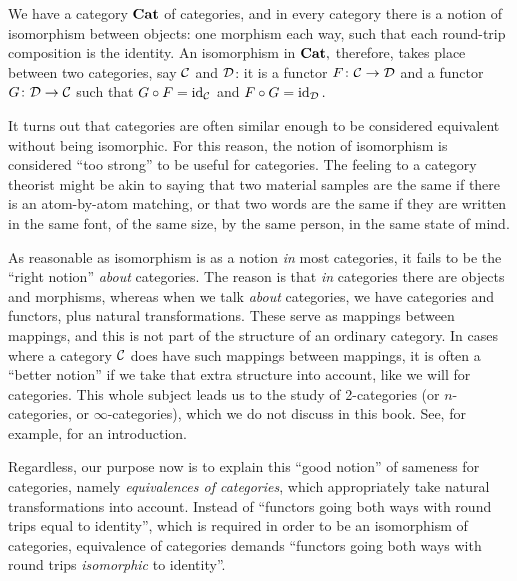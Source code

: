 \documentclass[../main/CT4S-EN-RU]{subfiles}
\begin{document}
\begin{blockENG}
We have a category ${\mathbf{Cat}}$ of categories, and in every category there is a notion of isomorphism between objects: one morphism each way, such that each round-trip composition is the identity. An isomorphism in ${\mathbf{Cat}},$ therefore, takes place between two categories, say $\mathcal{C}$ and $\mathcal{D}$: it is a functor $F\colon\mathcal{C}\rightarrow\mathcal{D}$ and a functor $G\colon\mathcal{D}\rightarrow\mathcal{C}$ such that $G\circ F=\operatorname{id}_\mathcal{C}$ and $F\circ G=\operatorname{id}_\mathcal{D}.$ 
\end{blockENG}

\begin{blockRUS}
\end{blockRUS}

\begin{blockENG}
It turns out that categories are often similar enough to be considered equivalent without being isomorphic. For this reason, the notion of isomorphism is considered “too strong” to be useful for categories. The feeling to a category theorist might be akin to saying that two material samples are the same if there is an atom-by-atom matching, or that two words are the same if they are written in the same font, of the same size, by the same person, in the same state of mind. 
\end{blockENG}

\begin{blockRUS}
\end{blockRUS}

\begin{blockENG}
As reasonable as isomorphism is as a notion {\em in} most categories, it fails to be the “right notion” {\em about} categories. The reason is that {\em in} categories there are objects and morphisms, whereas when we talk {\em about} categories, we have categories and functors, plus natural transformations. These serve as mappings between mappings, and this is not part of the structure of an ordinary category. In cases where a category $\mathcal{C}$ does have such mappings between mappings, it is often a “better notion” if we take that extra structure into account, like we will for categories. This whole subject leads us to the study of 2-categories (or $n$-categories, or $\infty$-categories), which we do not discuss in this book. See, for example, \cite{Le1} for an introduction.
\end{blockENG}

\begin{blockRUS}
\end{blockRUS}

\begin{blockENG}
Regardless, our purpose now is to explain this “good notion” of sameness for categories, namely {\em equivalences of categories}, which appropriately take natural transformations into account. Instead of “functors going both ways with round trips equal to identity”, which is required in order to be an isomorphism of categories, equivalence of categories demands “functors going both ways with round trips {\em isomorphic} to identity”.
\end{blockENG}
\end{document}
